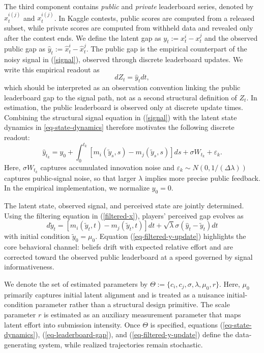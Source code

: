 \documentclass[mnsc]{informs3}
\begin{document}
The third component contains \textit{public} and \textit{private} leaderboard series, denoted by $\hat{x}^{i(j)}_t$ and $x^{i(j)}_t$.
In Kaggle contests, public scores are computed from a released subset, while private scores are computed from withheld data and revealed only after the contest ends.
We define the latent gap as $y_t:=x_t^i-x_t^j$ and the observed public gap as $\hat{y}_t:=\hat{x}_t^i-\hat{x}_t^j$.
The public gap is the empirical counterpart of the noisy signal in (\ref{signal}), observed through discrete leaderboard updates.
We write this empirical readout as
\begin{equation}\label{eq-model-signal}
dZ_t = \hat y_tdt,
\end{equation}
which should be interpreted as an observation convention linking the public leaderboard gap to the signal path, not as a second structural definition of $Z_t$.
In estimation, the public leaderboard is observed only at discrete update times.
Combining the structural signal equation in (\ref{signal}) with the latent state dynamics in \eqref{eq-state-dynamics} therefore motivates the following discrete readout:
\begin{equation}\label{eq-leaderboard-gap}
\hat y_{t_k}
=
y_0+\int_0^{t_k}\left[m_i(\tilde{y}_s,s)-m_j(\tilde{y}_s,s)\right]ds
+\sigma W_{t_k}
+\varepsilon_k.
\end{equation}
Here, $\sigma W_{t_k}$ captures accumulated innovation noise and $\varepsilon_k\sim N(0,1/(\Delta\lambda))$ captures public-signal noise, so that larger $\lambda$ implies more precise public feedback.
In the empirical implementation, we normalize $y_0=0$.

The latent state, observed signal, and perceived state are jointly determined.
Using the filtering equation in (\ref{filtered-x}), players’ perceived gap evolves as
\begin{equation}\label{eq-filtered-y-update}
d\tilde{y}_{t} = \left[m_i(\tilde{y}_t, t) - m_j(\tilde{y}_t, t)\right]dt + \sqrt{\lambda}\sigma(\hat{y}_t-\tilde{y}_{t}) dt
\end{equation}
with initial condition $\tilde{y}_0 = \mu_0$.
Equation (\ref{eq-filtered-y-update}) highlights the core behavioral channel: beliefs drift with expected relative effort and are corrected toward the observed public leaderboard at a speed governed by signal informativeness.

We denote the set of estimated parameters by $\Theta := \{c_i, c_j, \sigma, \lambda, \mu_0,r\}$.
Here, $\mu_0$ primarily captures initial latent alignment and is treated as a nuisance initial-condition parameter rather than a structural design primitive.
The scale parameter $r$ is estimated as an auxiliary measurement parameter that maps latent effort into submission intensity.
Once $\Theta$ is specified, equations (\ref{eq-state-dynamics}), (\ref{eq-leaderboard-gap}), and (\ref{eq-filtered-y-update}) define the data-generating system, while realized trajectories remain stochastic.
\end{document}
